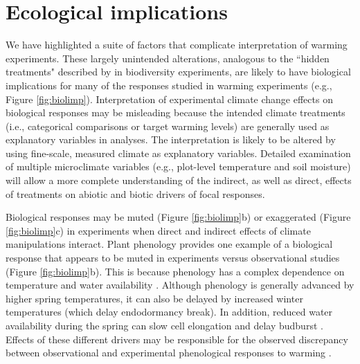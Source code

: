 \documentclass{article}
\begin{document}
\section* {Ecological implications}

\par We have highlighted a suite of factors that complicate interpretation of warming experiments. These largely unintended alterations, analogous to the ``hidden treatments" described by \citet{huston1997} in biodiversity experiments, are likely to have biological implications for many of the responses studied in warming experiments (e.g., Figure \ref{fig:biolimp}). Interpretation of experimental climate change effects on biological responses may be misleading because the intended climate treatments (i.e., categorical comparisons or target warming levels) are generally used as explanatory variables in analyses. The interpretation is likely to be altered by using fine-scale, measured climate as explanatory variables. Detailed examination of multiple microclimate variables (e.g., plot-level temperature and soil moisture) will allow a more complete understanding of the indirect, as well as direct, effects of treatments on abiotic and biotic drivers of focal responses.

\par Biological responses may be muted  (Figure \ref{fig:biolimp}b) or exaggerated  (Figure \ref{fig:biolimp}c) in experiments when direct and indirect effects of climate manipulations interact. Plant phenology provides one example of a biological response that appears to be muted in experiments versus observational studies (Figure \ref{fig:biolimp}b). This is because phenology has a complex dependence on temperature and water availability \citep[as well as other factors,][]{davis2015}. Although phenology is generally advanced by higher spring temperatures, it can also be delayed by increased winter temperatures (which delay endodormancy break). In addition, reduced water availability during the spring can slow cell elongation and delay budburst \citep{penuelas2004,ourcival2011,craine2012,matthews2016}. Effects of these different drivers may be responsible for the observed discrepancy between observational and experimental phenological responses to warming \citep{wolkovich2012}. 
\end{document}
